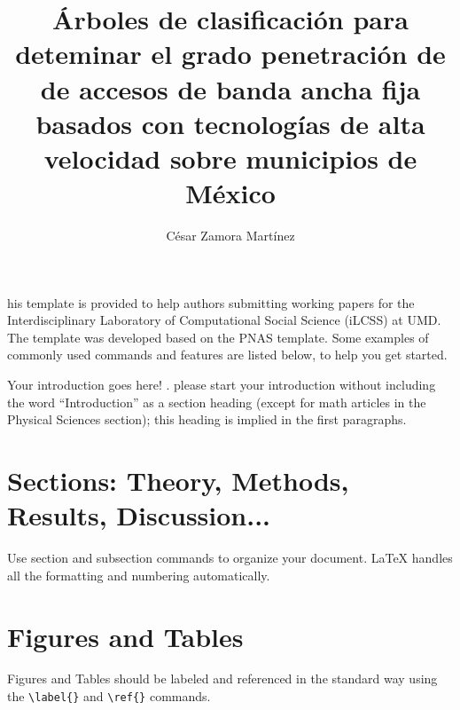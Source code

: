 \documentclass[9pt,twocolumn,twoside]{ilcss}
\title{\'Arboles de clasificaci\'on para  deteminar el grado penetraci\'on de de accesos de banda ancha fija basados con tecnologías de alta velocidad sobre municipios  de M\'exico}
\author[a]{C\'esar Zamora Mart\'inez}
\affil[a]{Alumno de Maestr\'ia en Ciencias de Datos (ITAM)}
\begin{document}
\maketitle
\thispagestyle{firststyle}


his template is provided to help authors submitting working papers for the Interdisciplinary Laboratory of Computational Social Science (iLCSS) at UMD. The template was developed based on the PNAS template. Some examples of commonly used commands and features are listed below, to help you get started.

Your introduction goes here! . please start your introduction without including the word ``Introduction'' as a section heading (except for math articles in the Physical Sciences section); this heading is implied in the first paragraphs. 



\section*{Sections: Theory, Methods, Results, Discussion...}

Use section and subsection commands to organize your document. \LaTeX{} handles all the formatting and numbering automatically. 

\section{Figures and Tables}

Figures and Tables should be labeled and referenced in the standard way using the \verb|\label{}| and \verb|\ref{}| commands.
\end{document}
